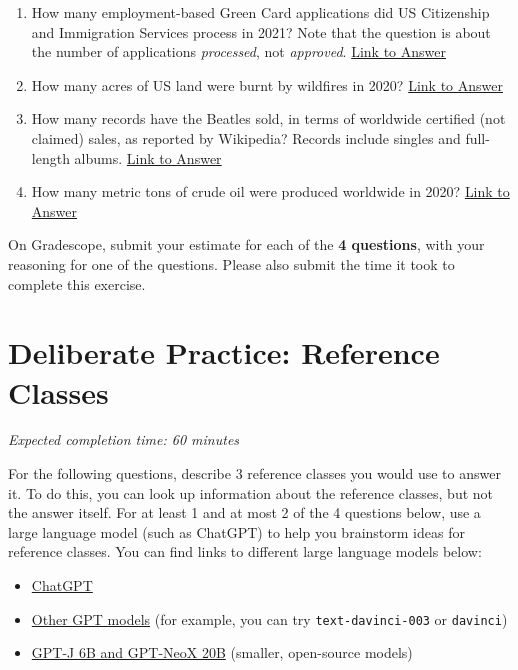 \documentclass[11pt]{article}
\begin{document}
\begin{enumerate}
	\item How many employment-based Green Card applications did US Citizenship and Immigration Services process in 2021? Note that the question is about the number of applications \emph{processed}, not \emph{approved}. \href{https://www.uscis.gov/newsroom/news-releases/uscis-announces-fy-2021-accomplishments}{Link to Answer}
	\item How many acres of US land were burnt by wildfires in 2020? \href{https://sgp.fas.org/crs/misc/IF10244.pdf}{Link to Answer}
	\item How many records have the Beatles sold, in terms of worldwide certified (not claimed) sales, as reported by Wikipedia? Records include singles and full-length albums. \href{https://en.wikipedia.org/wiki/List_of_best-selling_music_artists#250_million_or_more_records}{Link to Answer}
	\item How many metric tons of crude oil were produced worldwide in 2020? \href{https://www.statista.com/statistics/265229/global-oil-production-in-million-metric-tons/#:~:text=In$\%$202020$\%$2C$\%$20global$\%$20crude$\%$20oil,about$\%$204.2$\%$20billion$\%$20metric$\%$20tons}{Link to Answer}
\end{enumerate}

On Gradescope, submit your estimate for each of the \textbf{4 questions}, with your reasoning for one of the questions. Please also submit the time it took to complete this exercise.

\section*{Deliberate Practice: Reference Classes}

\emph{Expected completion time: 60 minutes}

For the following questions, describe 3 reference classes you would use to answer it. To do this, you can look up information about the reference classes, but not the answer itself. For at least 1 and at most 2 of the 4 questions below, use a large language model (such as ChatGPT) to help you brainstorm ideas for reference classes. You can find links to different large language models below: 
\begin{itemize}
	\item \href{https://chat.openai.com/}{ChatGPT}
	\item \href{https://platform.openai.com/playground}{Other GPT models} (for example, you can try \texttt{text-davinci-003} or \texttt{davinci})
	\item \href{https://textsynth.com/playground.html}{GPT-J 6B and GPT-NeoX 20B} (smaller, open-source models)
\end{itemize}
\end{document}
